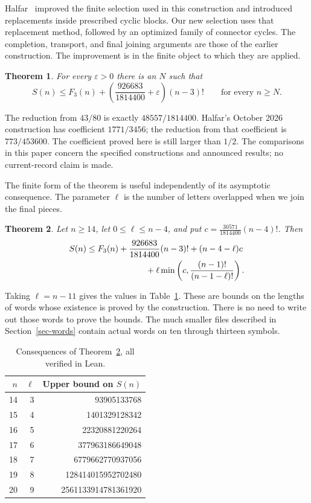 \documentclass[11pt]{article}
\newtheorem{theorem}{Theorem}[section]
\newcommand{\F}{F_3}
\newcommand{\lam}{\frac{926683}{1814400}}
\newcommand{\gam}{\frac{30571}{1814400}}
\begin{document}
Halfar~\cite{halfar} improved the finite selection used in this construction
and introduced replacements inside prescribed cyclic blocks. Our new
selection uses that replacement method, followed by an optimized family
of connector cycles. The completion, transport, and final joining
arguments are those of the earlier construction. The improvement is in
the finite object to which they are applied.

\begin{theorem}\label{thm-asymptotic}
For every $\varepsilon>0$ there is an $N$ such that
\[
 S(n)\le \F(n)+\left(\lam+\varepsilon\right)(n-3)!
 \qquad\text{for every }n\ge N.
\]
\end{theorem}

The reduction from $43/80$ is exactly $48557/1814400$. Halfar's
October 2026 construction has coefficient $1771/3456$; the reduction from
that coefficient is $773/453600$. The coefficient proved here is still larger
than $1/2$. The comparisons in this paper concern the specified
constructions and announced results; no current-record claim is made.

The finite form of the theorem is useful independently of its asymptotic
consequence. The parameter $\ell$ is the number of letters overlapped when
we join the final pieces.

\begin{theorem}\label{thm-finite}
Let $n\ge14$, let $0\le\ell\le n-4$, and put
$c=\gam(n-4)!$. Then
\[
 \begin{split}
 S(n)\le {}&\F(n)+\lam(n-3)!+(n-4-\ell)c\\
 &\hspace{20mm}+\ell\min\left(c,\frac{(n-1)!}{(n-1-\ell)!}\right).
 \end{split}
\]
\end{theorem}

Taking $\ell=n-11$ gives the values in Table~\ref{tab-finite}. These are
bounds on the lengths of words whose existence is proved by the
construction. There is no need to write out those words to prove the
bounds. The much smaller files described in Section~\ref{sec-words}
contain actual words on ten through thirteen symbols.

\begin{table}[ht]
\centering
\begin{tabular}{rrr}
\toprule
$n$ & $\ell$ & Upper bound on $S(n)$\\
\midrule
14 & 3 & \num{93905133768}\\
15 & 4 & \num{1401329128342}\\
16 & 5 & \num{22320881220264}\\
17 & 6 & \num{377963186649048}\\
18 & 7 & \num{6779662770937056}\\
19 & 8 & \num{128414015952702480}\\
20 & 9 & \num{2561133914781361920}\\
\bottomrule
\end{tabular}
\caption{Consequences of Theorem~\ref{thm-finite}, all verified in Lean.}
\label{tab-finite}
\end{table}
\end{document}
